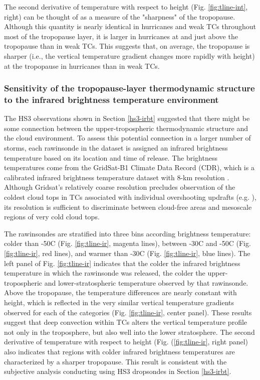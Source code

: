 The second derivative of temperature with respect to height (Fig. \ref{fig:tline-int}, right) can be thought of as a measure of the "sharpness" of the tropopause.
Although this quantity is nearly identical in hurricanes and weak TCs throughout most of the tropopause layer, it is larger in hurricanes at and just above the tropopause than in weak TCs.
This suggests that, on average, the tropopause is sharper (i.e., the vertical temperature gradient changes more rapidly with height) at the tropopause in hurricanes than in weak TCs.

\subsubsection{Sensitivity of the tropopause-layer thermodynamic structure to the infrared brightness temperature environment}
The HS3 observations shown in Section \ref{hs3-irbt} suggested that there might be some connection between the upper-tropospheric thermodynamic structure and the cloud environment.
To assess this potential connection in a larger number of storms, each rawinsonde in the dataset is assigned an infrared brightness temperature based on its location and time of release.
The brightness temperatures come from the GridSat-B1 Climate Data Record (CDR), which is a calibrated infrared brightness temperature dataset with 8-km resolution \cite{Knappetal2011}.
Although Gridsat's relatively coarse resolution precludes observation of the coldest cloud tops in TCs associated with individual overshooting updrafts (e.g. \citeauthor{Griffin2017} \citeyear{Griffin2017}), its resolution is sufficient to discriminate between cloud-free areas and mesoscale regions of very cold cloud tops.

The rawinsondes are stratified into three bins according brightness temperature: colder than -50\textdegree{}C (Fig. \ref{fig:tline-ir}, magenta lines), between -30\textdegree{}C and -50\textdegree{}C (Fig. \ref{fig:tline-ir}, red lines), and warmer than -30\textdegree{}C (Fig. \ref{fig:tline-ir}, blue lines).
The left panel of Fig. \ref{fig:tline-ir} indicates that the colder the infrared brightness temperature in which the rawinsonde was released, the colder the upper-tropospheric and lower-stratospheric temperature observed by that rawinsonde.
Above the tropopause, the temperature differences are nearly constant with height, which is reflected in the very similar vertical temperature gradients observed for each of the categories (Fig. \ref{fig:tline-ir}, center panel).
These results suggest that deep convection within TCs alters the vertical temperature profile not only in the troposphere, but also well into the lower stratosphere.
The second derivative of temperature with respect to height (Fig. (\ref{fig:tline-ir}, right panel) also indicates that regions with colder infrared brightness temperatures are characterized by a sharper tropopause.
This result is consistent with the subjective analysis conducting using HS3 dropsondes in Section \ref{hs3-irbt}.

